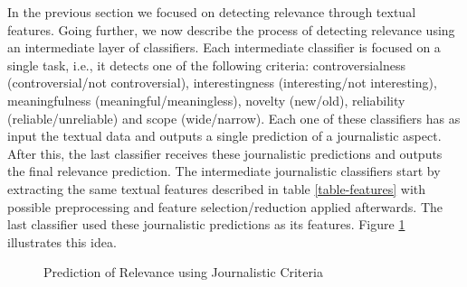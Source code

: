 In the previous section we focused on detecting relevance through textual features. Going further, we now describe the process of detecting relevance using an intermediate layer of classifiers. Each intermediate classifier is focused on a single task, i.e., it detects one of the following criteria: controversialness (controversial/not controversial), interestingness (interesting/not interesting), meaningfulness (meaningful/meaningless), novelty (new/old), reliability (reliable/unreliable) and scope (wide/narrow). Each one of these classifiers has as input the textual data and outputs a single prediction of a journalistic aspect. After this, the last classifier receives these journalistic predictions and outputs the final relevance prediction. The intermediate journalistic classifiers start by extracting the same textual features described in table \ref{table-features} with possible preprocessing and feature selection/reduction applied afterwards. The last classifier used these journalistic predictions as its features. Figure \ref{fig:diag-journalistic-criteria} illustrates this idea.
\begin{figure}[H]
	\centering
	\caption[Prediction of Relevance using Journalistic Criteria]{Prediction of Relevance using Journalistic Criteria}
	\label{fig:diag-journalistic-criteria}
\end{figure}

